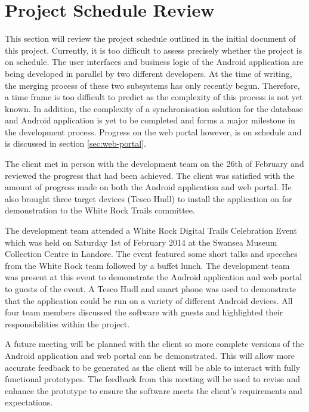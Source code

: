\documentclass[11pt,a4paper]{article}
\begin{document}
\section{Project Schedule Review}

This section will review the project schedule outlined in the initial document of this project. Currently, it is too difficult to assess precisely whether the project is on schedule. The user interfaces and business logic of the Android application are being developed in parallel by two different developers. At the time of writing, the merging process of these two subsystems has only recently begun. Therefore, a time frame is too difficult to predict as the complexity of this process is not yet known. In addition, the complexity of a synchronisation solution for the database and Android application is yet to be completed and forms a major milestone in the development process. Progress on the web portal however, is on schedule and is discussed in section \ref{sec:web-portal}.

The client met in person with the development team on the 26th of February and reviewed the progress that had been achieved. The client was satisfied with the amount of progress made on both the Android application and web portal.  He also brought three target devices (Tesco Hudl) to install the application on for demonstration to the White Rock Trails committee.

The development team attended a White Rock Digital Trails Celebration Event which was held on Saturday 1st of February 2014 at the Swansea Museum Collection Centre in Landore. The event featured some short talks and speeches from the White Rock team followed by a buffet lunch. The development team was present at this event to demonstrate the Android application and web portal to guests of the event. A Tesco Hudl and smart phone was used to demonstrate that the application could be run on a variety of different Android devices. All four team members discussed the software with guests and highlighted their responsibilities within the project.

A future meeting will be planned with the client so more complete versions of the Android application and web portal can be demonstrated. This will allow more accurate feedback to be generated as the client will be able to interact with fully functional prototypes. The feedback from this meeting will be used to revise and enhance the prototype to ensure the software meets the client's requirements and expectations.
\end{document}
